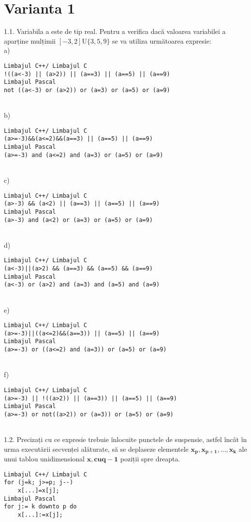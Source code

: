 \section*{Varianta 1}


1.1. Variabila a este de tip real. Pentru a verifica dacă valoarea variabilei a aparține mulțimii $[-3,2] \mathrm{U}\{3,5,9\}$ se va utiliza următoarea expresie:
\\
a) \begin{verbatim}
Limbajul C++/ Limbajul C
!((a<-3) || (a>2)) || (a==3) || (a==5) || (a==9)
Limbajul Pascal
not ((a<-3) or (a>2)) or (a=3) or (a=5) or (a=9)
\end{verbatim}
\\
b) \begin{verbatim}
Limbajul C++/ Limbajul C
(a>=-3)&&(a<=2)&&(a==3) || (a==5) || (a==9)
Limbajul Pascal
(a>=-3) and (a<=2) and (a=3) or (a=5) or (a=9)
\end{verbatim}
\\
c) \begin{verbatim}
Limbajul C++/ Limbajul C
(a>-3) && (a<2) || (a==3) || (a==5) || (a==9)
Limbajul Pascal
(a>-3) and (a<2) or (a=3) or (a=5) or (a=9)
\end{verbatim}
\\
d) \begin{verbatim}
Limbajul C++/ Limbajul C
(a<-3)||(a>2) && (a==3) && (a==5) && (a==9)
Limbajul Pascal
(a<-3) or (a>2) and (a=3) and (a=5) and (a=9)
\end{verbatim}
\\
e) \begin{verbatim}
Limbajul C++/ Limbajul C
(a>=-3)||((a<=2)&&(a==3)) || (a==5) || (a==9)
Limbajul Pascal
(a>=-3) or ((a<=2) and (a=3)) or (a=5) or (a=9)
\end{verbatim}
\\
f) \begin{verbatim}
Limbajul C++/ Limbajul C
(a>=-3) || !((a>2)) || (a==3)) || (a==5) || (a==9)
Limbajul Pascal
(a>=-3) or not((a>2)) or (a=3)) or (a=5) or (a=9)
\end{verbatim}
\\
1.2. Precizați cu ce expresie trebuie înlocuite punctele de suspensie, astfel încât în urma executării secvenței alăturate, să se deplaseze elementele $\mathbf{x}_{\mathbf{p}}, \mathbf{x}_{\mathbf{p}+\mathbf{1}}, \ldots, \mathbf{x}_{\mathbf{k}}$ ale unui tablou unidimensional $\mathbf{x}, \mathbf{c u} \mathbf{q - 1}$ poziții spre dreapta.
\begin{verbatim}
Limbajul C++/ Limbajul C
for (j=k; j>=p; j--)
    x[...]=x[j];
Limbajul Pascal
for j:= k downto p do
    x[...]:=x[j];
\end{verbatim}
